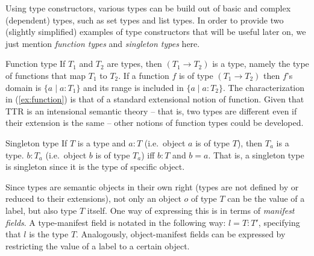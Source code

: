 \documentclass[output=paper
 	        ,biblatex
                ,babelshorthands
                ,newtxmath
                ,draftmode
                ,colorlinks, citecolor=brown
]{langscibook}
\begin{document}

Using type constructors, various types can be build out of basic and complex (dependent) types, such as set types and list types. 
%
In order to provide two (slightly simplified) examples of type constructors that will be useful later on, we just mention \emph{function types} and \emph{singleton types} here.

\ea Function type \label{ex:function}
\ea If $T_1$ and $T_2$ are types, then $(T_1 \rightarrow T_2)$ is a type, namely the type of functions that map $T_1$ to $T_2$.
\ex If a function $f$ is of type $(T_1 \rightarrow T_2)$ then $f$'s domain is $\{a \mid a : T_1\}$ and its range is included in $\{a \mid a : T_2\}$.
\z
\z 
%
The characterization in (\ref{ex:function}) is that of a standard extensional notion of function. 
%
Given that TTR is an intensional semantic theory -- that is, two types are different even if their extension is the same -- other notions of function types could be developed.


\ea Singleton type
\ea If $T$ is a type and $a : T$ (i.e.\ object $a$ is of type $T$), then $T_a$ is a type.
\ex $b : T_a$ (i.e.\ object $b$ is of type $T_a$) iff $b : T$ and $b = a$.
\z
\z
%
That is, a singleton type is singleton since it is the type of specific object. 

Since types are semantic objects in their own right (types are not defined by or reduced to their extensions), not only an object $o$ of type $T$ can be the value of a label, but also  type $T$ itself.
%
One way of expressing this is in terms of 
\emph{manifest fields}.
%
A type-manifest field is notated in the following way: $l=T : T'$, specifying that $l$ is the type $T$.
%
Analogously, object-manifest fields can be expressed by restricting the value of a label to a certain object.
\end{document}
